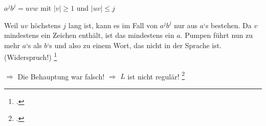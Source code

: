 \documentclass{lehramt-informatik-haupt}
\begin{document}
\begin{center}
$a^j b^j = uvw$ mit $|v| \geq 1$ und $|uv| \leq j$
\end{center}

\noindent
Weil $uv$ höchstens $j$ lang ist, kann es im Fall von $a^j b^j$ nur aus
$a$‘s bestehen. Da $v$ mindestens ein Zeichen enthält, ist das
mindestens ein $a$. Pumpen führt nun zu mehr $a$‘s als $b$‘s und also zu
einem Wort, das nicht in der Sprache ist. (Widerspruch!)
\footcite{wiki:pumping}

$\Rightarrow$ Die Behauptung war falsch!
$\Rightarrow$ $L$ ist nicht regulär!
\footcite[Seite 63-64]{theo:fs:1}


\literatur
\end{document}
